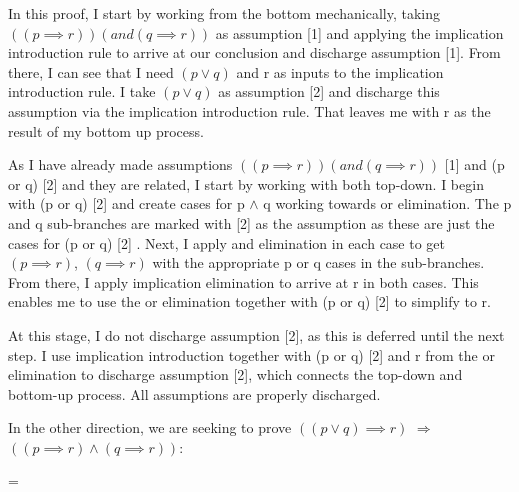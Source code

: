 \documentclass[a4paper,10pt,fleqn]{article}
\begin{document}
\noindent In this proof, I start by working from the bottom mechanically, taking $((p \implies r))(and(q \implies r))$ as assumption [1] and applying the implication introduction rule to arrive at our conclusion and discharge assumption [1]. From there, I can see that I need $(p \lor q)$ and r as inputs to the implication introduction rule.  I take $(p \lor q)$ as assumption [2] and discharge this assumption via the implication introduction rule.  That leaves me with r as the result of my bottom up process.  

\bigskip

\noindent As I have already made assumptions $((p \implies r))(and(q \implies r))$ [1] and (p or q) [2] and they are related, I start by working with both top-down. I begin with (p or q) [2] and create cases for p $\land$ q working towards or elimination.  The p and q sub-branches are marked with [2] as the assumption as these are just the cases for (p or q) [2] \citep[slide 41]{simpson25c}. Next, I apply and elimination in each case to get $(p \implies r)$, $(q \implies r)$ with the appropriate p or q cases in the sub-branches.  From there, I apply implication elimination to arrive at r in both cases.  This enables me to use the or elimination together with (p or q) [2] to simplify to r.  

\bigskip

\noindent At this stage, I do not discharge assumption [2], as this is deferred until the next step. I use implication introduction together with (p or q) [2] and r from the or elimination to discharge assumption [2], which connects the top-down and bottom-up process. All assumptions are properly discharged.  

\bigskip

\noindent In the other direction, we are seeking to prove $((p \lor q) \implies r)$ $\Rightarrow$ $((p \implies r) \land (q \implies r))$:

\bigskip

\savedleftskip=\leftskip
\noindent
{}
\bigskip
\end{document}
